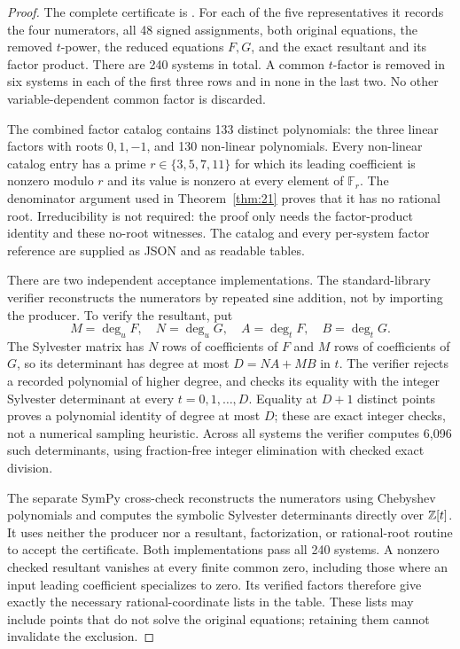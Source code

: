 \documentclass[11pt]{article}
\theoremstyle{definition}\newtheorem{definition}[theorem]{Definition}
\theoremstyle{remark}\newtheorem{remark}[theorem]{Remark}
\begin{document}
\begin{proof}
The complete certificate is . For each of the five representatives it records the four numerators, all 48 signed assignments, both original equations, the removed $t$-power, the reduced equations $F,G$, and the exact resultant and its factor product. There are 240 systems in total. A common $t$-factor is removed in six systems in each of the first three rows and in none in the last two. No other variable-dependent common factor is discarded.

The combined factor catalog contains 133 distinct polynomials: the three linear factors with roots $0,1,-1$, and 130 non-linear polynomials. Every non-linear catalog entry has a prime $r\in\{3,5,7,11\}$ for which its leading coefficient is nonzero modulo $r$ and its value is nonzero at every element of $\mathbb F_r$. The denominator argument used in Theorem~\ref{thm:21} proves that it has no rational root. Irreducibility is not required: the proof only needs the factor-product identity and these no-root witnesses. The catalog and every per-system factor reference are supplied as JSON and as readable tables.

There are two independent acceptance implementations. The standard-library verifier reconstructs the numerators by repeated sine addition, not by importing the producer. To verify the resultant, put
\[
M=\deg_uF,\quad N=\deg_uG,\quad A=\deg_tF,\quad B=\deg_tG.
\]
The Sylvester matrix has $N$ rows of coefficients of $F$ and $M$ rows of coefficients of $G$, so its determinant has degree at most $D=NA+MB$ in $t$. The verifier rejects a recorded polynomial of higher degree, and checks its equality with the integer Sylvester determinant at every $t=0,1,\ldots,D$. Equality at $D+1$ distinct points proves a polynomial identity of degree at most $D$; these are exact integer checks, not a numerical sampling heuristic. Across all systems the verifier computes 6,096 such determinants, using fraction-free integer elimination with checked exact division.

The separate SymPy cross-check reconstructs the numerators using Chebyshev polynomials and computes the symbolic Sylvester determinants directly over $\mathbb Z[t]$. It uses neither the producer nor a resultant, factorization, or rational-root routine to accept the certificate. Both implementations pass all 240 systems. A nonzero checked resultant vanishes at every finite common zero, including those where an input leading coefficient specializes to zero. Its verified factors therefore give exactly the necessary rational-coordinate lists in the table. These lists may include points that do not solve the original equations; retaining them cannot invalidate the exclusion.
\end{proof}
\end{document}
